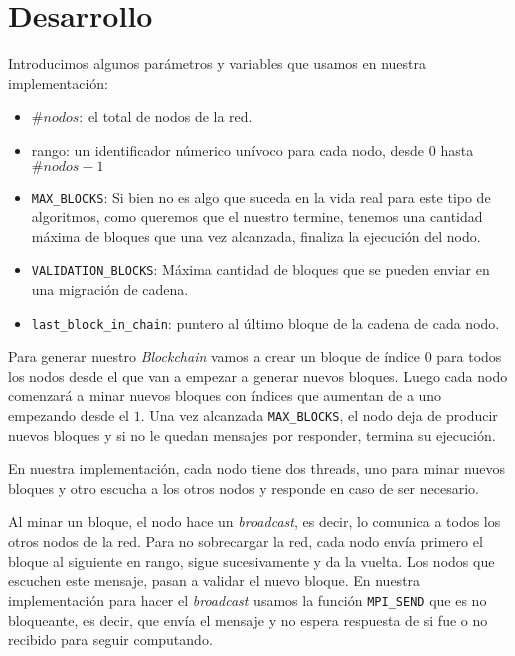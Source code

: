 
\section{Desarrollo}







Introducimos algunos par\'ametros y variables que usamos en nuestra implementaci\'on:
\begin{itemize}
	\item $\#nodos$: el total de nodos de la red.
	\item rango: un identificador n\'umerico un\'ivoco para cada nodo, desde $0$ hasta $\#nodos - 1$
	\item \texttt{MAX\_BLOCKS}: Si bien no es algo que suceda en la vida real para este tipo de algoritmos, como queremos que el nuestro termine, tenemos una cantidad m\'axima de bloques que una vez alcanzada, finaliza la ejecuci\'on del nodo.
	\item \texttt{VALIDATION\_BLOCKS}: M\'axima cantidad de bloques que se pueden enviar en una migraci\'on de cadena.
	\item \texttt{last\_block\_in\_chain}: puntero al \'ultimo bloque de la cadena de cada nodo. 
\end{itemize}

Para generar nuestro \textit{Blockchain} vamos a crear un bloque de \'indice $0$ para todos los nodos desde el que van a empezar a generar nuevos bloques. Luego cada nodo comenzar\'a a minar nuevos bloques con \'indices que aumentan de a uno empezando desde el $1$. Una vez alcanzada \texttt{MAX\_BLOCKS}, el nodo deja de producir nuevos bloques y si no le quedan mensajes por responder, termina su ejecuci\'on.

En nuestra implementaci\'on, cada nodo tiene dos threads, uno para minar nuevos bloques y otro escucha a los otros nodos y responde en caso de ser necesario.

Al minar un bloque, el nodo hace un \textit{broadcast}, es decir, lo comunica a todos los otros nodos de la red. Para no sobrecargar la red, cada nodo env\'ia primero el bloque al siguiente en rango, sigue sucesivamente y da la vuelta. Los nodos que escuchen este mensaje, pasan a validar el nuevo bloque. En nuestra implementaci\'on para hacer el \textit{broadcast} usamos la funci\'on \texttt{MPI\_SEND} que es no bloqueante, es decir, que env\'ia el mensaje y no espera respuesta de si fue o no recibido para seguir computando.

